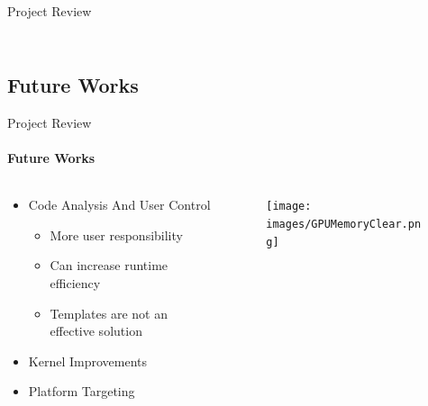 \begin{frame}[t]{Project Review}
\begin{columns}[T]
\begin{column}{.48\textwidth}
\begin{figure}
      \end{figure}
    \end{column}
    \end{columns}
	\end{frame}

	\subsection{Future Works}
	\begin{frame}[t]{Project Review}\framesubtitle{Future Works}
	\begin{columns}[T]
	\begin{column}{0.48\textwidth}
		\begin{itemize}
			\item Code Analysis And User Control
			\begin{itemize}
				\item More user responsibility
				\item Can increase runtime efficiency
				\item Templates are not an effective solution
			\end{itemize}
			\item Kernel Improvements
			\item Platform Targeting
		\end{itemize}
	\end{column}
	\begin{column}{.48\textwidth}
      \begin{figure}
         \texttt{[image: images/GPUMemoryClear.png]}
      \end{figure}
    \end{column}
    \end{columns}
	\end{frame}

